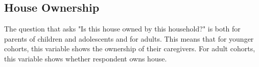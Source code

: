 \subsection{House Ownership}
The question that asks "Is this house owned by this household?" is both for parents of children and adolescents and for adults. This means that for younger cohorts, this variable shows the ownership of their caregivers. For adult cohorts, this variable shows whether respondent owns house. 
